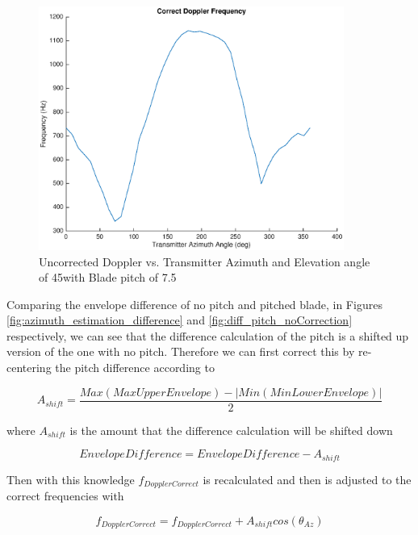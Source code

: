 \begin{figure}
	\begin{center}
		\includegraphics[width=10cm]{images/results/correct_dop_pitch_noCorrection.eps}
		\caption{Uncorrected Doppler vs. Transmitter Azimuth and Elevation angle of 45\textdegree with Blade pitch of 7.5\textdegree}
		\label{fig:dop_pitch_noCorrection}
	\end{center}
\end{figure}

Comparing the envelope difference of no pitch and pitched blade, in Figures \ref{fig:azimuth_estimation_difference} and \ref{fig:diff_pitch_noCorrection} respectively, we can see that the difference calculation of the pitch is a shifted up version of the one with no pitch. Therefore we can first correct this by re-centering the pitch difference according to 

\begin{equation}
	A_{shift} = \frac{Max(Max Upper Envelope) - |Min(Min Lower Envelope)|}{2}
	\label{eqn:pitch_shift}
\end{equation}

where $A_{shift}$ is the amount that the difference calculation will be shifted down

\begin{equation}
	EnvelopeDifference = EnvelopeDifference - A_{shift}
	\label{eqn:diff_shift}
\end{equation}

Then with this knowledge $f_{DopplerCorrect}$ is recalculated and then is adjusted to the correct frequencies with

\begin{equation}
	f_{DopplerCorrect} = f_{DopplerCorrect} + A_{shift}cos\left(\theta_{Az}\right)
	\label{eqn:fd_pitch_correct}
\end{equation}


